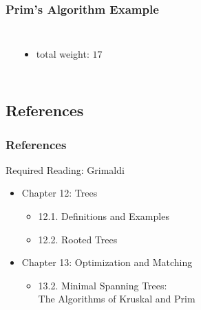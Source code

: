\documentclass[dvipsnames]{beamer}
\begin{document}
\begin{frame}
  \frametitle{Prim's Algorithm Example}

  \begin{example}[$7 \nless 7$]
    \begin{columns}
      \begin{center}
      \end{center}

      \begin{itemize}
        \item total weight: $17$
      \end{itemize}
    \end{columns}
  \end{example}
\end{frame}

\subsection*{References}

\begin{frame}
  \frametitle{References}

  \begin{block}{Required Reading: Grimaldi}
    \begin{itemize}
      \item Chapter 12: Trees
      \begin{itemize}
        \item 12.1. \alert{Definitions and Examples}
        \item 12.2. \alert{Rooted Trees}
      \end{itemize}

      \item Chapter 13: Optimization and Matching
      \begin{itemize}
        \item 13.2. \alert{Minimal Spanning Trees:\\
                           The Algorithms of Kruskal and Prim}
      \end{itemize}
    \end{itemize}
  \end{block}
\end{frame}
\end{document}
